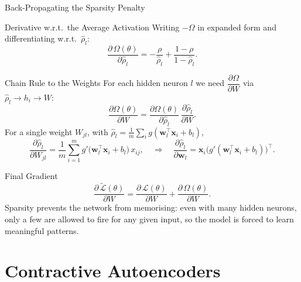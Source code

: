 \documentclass{beamer}
\begin{document}
\begin{frame}[shrink=10]{Back-Propagating the Sparsity Penalty}
  \begin{block}{Derivative w.r.t.\ the Average Activation}
    Writing $-\Omega$ in expanded form and differentiating w.r.t.\
    $\hat{\rho}_l$:
    \[
      \frac{\partial\,\Omega(\theta)}{\partial \hat{\rho}_l}
        = -\frac{\rho}{\hat{\rho}_l}
          + \frac{1-\rho}{1-\hat{\rho}_l}.
    \]
  \end{block}

  \begin{block}{Chain Rule to the Weights}
    For each hidden neuron $l$ we need
    $\dfrac{\partial\Omega}{\partial W}$ via
    $\hat{\rho}_l \to h_i \to W$:
    \[
      \frac{\partial\Omega(\theta)}{\partial W}
        = \frac{\partial\Omega(\theta)}{\partial\hat{\rho}_l}\,
          \frac{\partial\hat{\rho}_l}{\partial W}.
    \]
    For a single weight $W_{jl}$, with
    $\hat{\rho}_l = \frac1m\sum_{i} g(\mathbf{w}_l^{\top}\mathbf{x}_i + b_l)$,
    \[
      \frac{\partial\hat{\rho}_l}{\partial W_{jl}}
        = \frac{1}{m}\sum_{i=1}^{m}
          g'\!\bigl(\mathbf{w}_l^{\top}\mathbf{x}_i + b_l\bigr)\,x_{ij},
      \quad\Rightarrow\quad
      \frac{\partial\hat{\rho}_l}{\partial \mathbf{w}_l}
        = \mathbf{x}_i\bigl(g'(\mathbf{w}_l^{\top}\mathbf{x}_i+b_l)\bigr)^{\!\top}.
    \]
  \end{block}

  \begin{alertblock}{Final Gradient}
    \[
      \frac{\partial\,\widetilde{\mathcal L}(\theta)}{\partial W}
        = \frac{\partial\,\mathcal L(\theta)}{\partial W}
          + \frac{\partial\,\Omega(\theta)}{\partial W}.
    \]
    Sparsity prevents the network from memorising: even with many hidden
    neurons, only a few are allowed to fire for any given input, so the
    model is forced to learn meaningful patterns.
  \end{alertblock}
\end{frame}

\section{Contractive Autoencoders}
\end{document}

